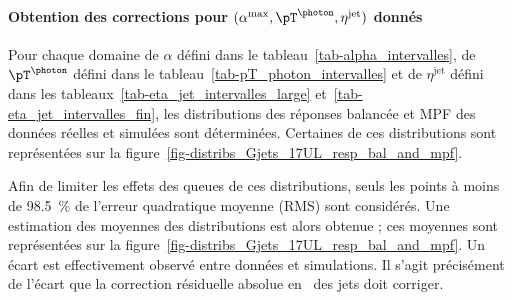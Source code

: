\paragraph{Obtention des corrections pour $(\alpha^\text{max}, \pT^{\photon}, \eta^\text{jet})$ donnés}
Pour chaque domaine
de $\alpha$ défini dans le tableau~\ref{tab-alpha_intervalles},
de $\pT^{\photon}$ défini dans le tableau~\ref{tab-pT_photon_intervalles} et
de $\eta^\text{jet}$ défini dans les tableaux~\ref{tab-eta_jet_intervalles_large} et~\ref{tab-eta_jet_intervalles_fin},
les distributions des réponses balancée et MPF des données réelles et simulées sont déterminées.
Certaines de ces distributions sont représentées sur la figure~\ref{fig-distribs_Gjets_17UL_resp_bal_and_mpf}.
\par Afin de limiter les effets des queues de ces distributions, seuls les points à moins de \SI{98.5}{\%} de l'erreur quadratique moyenne (RMS) sont considérés.
Une estimation des moyennes des distributions est alors obtenue ; ces moyennes sont représentées sur la figure~\ref{fig-distribs_Gjets_17UL_resp_bal_and_mpf}.
Un écart est effectivement observé entre données et simulations.
Il s'agit précisément de l'écart que la correction résiduelle absolue en \pT\ des jets doit corriger.
